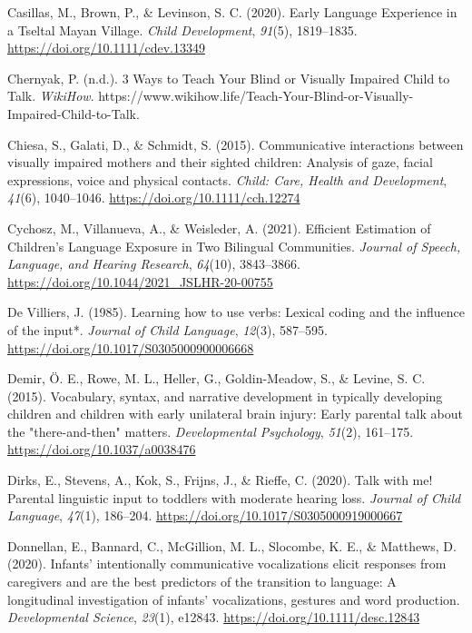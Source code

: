 \documentclass[
  man,floatsintext]{apa6}
\newlength{\cslhangindent}
\newlength{\cslentryspacingunit} %
\newenvironment{CSLReferences}[2] %
 {%
  \setlength{\parindent}{0pt}
  \ifodd #1
  \let\oldpar\par
  \def\par{\hangindent=\cslhangindent\oldpar}
  \fi
  \setlength{\parskip}{#2\cslentryspacingunit}
 }%
 {}
\begin{document}
\begin{CSLReferences}{1}{0}
\leavevmode{}%
Casillas, M., Brown, P., \& Levinson, S. C. (2020). Early {Language Experience} in a {Tseltal Mayan Village}. \emph{Child Development}, \emph{91}(5), 1819--1835. \url{https://doi.org/10.1111/cdev.13349}

\leavevmode{}%
Chernyak, P. (n.d.). 3 {Ways} to {Teach Your Blind} or {Visually Impaired Child} to {Talk}. \emph{WikiHow}. https://www.wikihow.life/Teach-Your-Blind-or-Visually-Impaired-Child-to-Talk.

\leavevmode{}%
Chiesa, S., Galati, D., \& Schmidt, S. (2015). Communicative interactions between visually impaired mothers and their sighted children: Analysis of gaze, facial expressions, voice and physical contacts. \emph{Child: Care, Health and Development}, \emph{41}(6), 1040--1046. \url{https://doi.org/10.1111/cch.12274}

\leavevmode{}%
Cychosz, M., Villanueva, A., \& Weisleder, A. (2021). Efficient {Estimation} of {Children}'s {Language Exposure} in {Two Bilingual Communities}. \emph{Journal of Speech, Language, and Hearing Research}, \emph{64}(10), 3843--3866. \url{https://doi.org/10.1044/2021_JSLHR-20-00755}

\leavevmode{}%
De Villiers, J. (1985). Learning how to use verbs: Lexical coding and the influence of the input*. \emph{Journal of Child Language}, \emph{12}(3), 587--595. \url{https://doi.org/10.1017/S0305000900006668}

\leavevmode{}%
Demir, Ö. E., Rowe, M. L., Heller, G., Goldin-Meadow, S., \& Levine, S. C. (2015). Vocabulary, syntax, and narrative development in typically developing children and children with early unilateral brain injury: Early parental talk about the "there-and-then" matters. \emph{Developmental Psychology}, \emph{51}(2), 161--175. \url{https://doi.org/10.1037/a0038476}

\leavevmode{}%
Dirks, E., Stevens, A., Kok, S., Frijns, J., \& Rieffe, C. (2020). Talk with me! {Parental} linguistic input to toddlers with moderate hearing loss. \emph{Journal of Child Language}, \emph{47}(1), 186--204. \url{https://doi.org/10.1017/S0305000919000667}

\leavevmode{}%
Donnellan, E., Bannard, C., McGillion, M. L., Slocombe, K. E., \& Matthews, D. (2020). Infants' intentionally communicative vocalizations elicit responses from caregivers and are the best predictors of the transition to language: {A} longitudinal investigation of infants' vocalizations, gestures and word production. \emph{Developmental Science}, \emph{23}(1), e12843. \url{https://doi.org/10.1111/desc.12843}


\end{CSLReferences}
\end{document}

